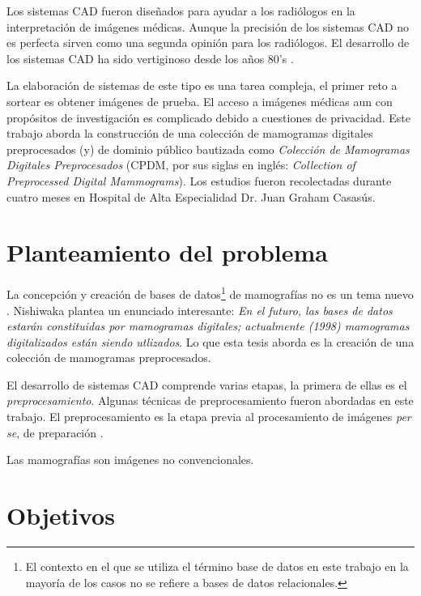 Los sistemas CAD fueron diseñados para ayudar a los radiólogos en la
interpretación de imágenes médicas. Aunque la precisión de los sistemas CAD no
es perfecta \cite{fenton2007influence} sirven como una segunda opinión para los
radiólogos. El desarrollo de los sistemas CAD ha sido vertiginoso desde los
años 80's \cite{giger2008anniversary}.

La elaboración de sistemas de este tipo es una tarea compleja, el primer reto a
sortear es obtener imágenes de prueba. El acceso a imágenes médicas aun con
propósitos de investigación es complicado debido a cuestiones de privacidad.
Este trabajo aborda la construcción de una colección de mamogramas digitales
preprocesados (y) de dominio público bautizada como \textit{Colección de
Mamogramas Digitales Preprocesados} (CPDM, por sus siglas en inglés:
\textit{Collection of Preprocessed Digital Mammograms}). Los estudios fueron
recolectadas durante cuatro meses en Hospital de Alta Especialidad Dr. Juan
Graham Casasús.

\section{Planteamiento del problema}

La concepción y creación de bases de datos\footnote{El contexto en el que se
utiliza el término base de datos en este trabajo en la mayoría de los casos no
se refiere a bases de datos relacionales.} de mamografías no es un tema nuevo
\cite{nishikawa1998mammographic}. Nishiwaka plantea un enunciado interesante:
\textit{En el futuro, las bases de datos estarán constituidas por mamogramas
digitales; actualmente (1998) mamogramas digitalizados están siendo utlizados}.
Lo que esta tesis aborda es la creación de una colección de mamogramas
preprocesados.

El desarrollo de sistemas CAD comprende varias etapas, la primera de ellas es
el \textit{preprocesamiento}. Algunas técnicas de preprocesamiento fueron
abordadas en este trabajo. El preprocesamiento es la etapa previa al
procesamiento de imágenes \textit{per se}, de preparación
\cite{ponraj2011survey}. 


Las mamografías son imágenes no convencionales.

\section{Objetivos}

